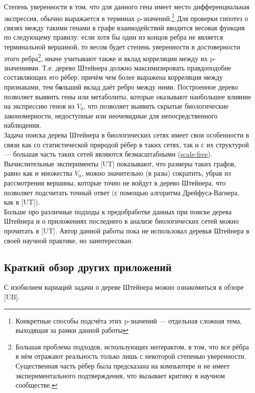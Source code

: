 \documentclass[11pt,a4paper]{report}
\theoremstyle{definition}
\theoremstyle{definition}
\theoremstyle{definition}
\begin{document}
	\noindent Степень уверенности в том, что для данного гена имеет место дифференциальная экспрессия, обычно выражается в терминах p-значений.\footnote{Конкретные способы подсчёта этих p-значений — отдельная сложная тема, выходящая за рамки данной работы} Для проверки гипотез о связях между такими генами в графе взаимодействий вводится весовая функция по следующему правилу: если хотя бы один из концов ребра не является терминальной вершиной, то весом будет степень уверенности в достоверности этого ребра\footnote{Большая проблема подходов, использующих интерактом, в том, что все рёбра в нём отражают реальность только лишь с некоторой степенью уверенности. Существенная часть рёбер была предсказана на компьютере и не имеет экспериментального подтверждения, что вызывает критику в научном сообществе.}, иначе учитывают также и вклад корреляции между их p-значениями. Т.е. дерево Штейнера должно максимизировать правдоподобие составляющих его рёбер, причём чем более выражена корреляция между признаками, тем б\textbf{о}льший вклад даёт ребро между ними. Построенное дерево позволяет выявить гены или метаболиты, которые оказывают наибольшее влияние на экспрессию генов из $V_0$, что позволяет выявить скрытые биологические закономерности, недоступные или неочевидные для непосредственного наблюдения.\\
	
	\noindent Задача поиска дерева Штейнера в биологических сетях имеет свои особенности в связи как со статистической природой рёбер в таких сетях, так и с их структурой — большая часть таких сетей являются безмасштабными  (\href{https://en.wikipedia.org/wiki/Scale-free_network}{scale-free}). Вычислительные эксперименты [UT] показывают, что размеры таких графов, равно как и множества $V_0$, можно значительно (в разы) сократить, убрав из рассмотрения вершины, которые точно не войдут в дерево Штейнера, что позволяет подсчитать точный ответ (с помощью алгоритма Дрейфуса-Вагнера, как в [UT]).\\
	
	\noindent Больше про различные подходы к предобработке данных при поиске дерева Штейнера и о приложениях последнего в анализе биологических сетей можно прочитать в [UT]. Автор данной работы пока не использовал деревья Штейнера в своей научной практике, но заинтересован.
	\subsection{Краткий обзор других приложений}
	С изобилием вариаций задачи о дереве Штейнера можно ознакомиться в обзоре [UB].
\end{document}
